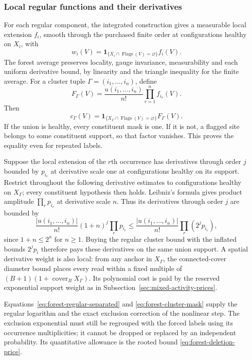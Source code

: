 \subsubsection{Local regular functions and their derivatives}
For each regular component, the integrated construction gives a
measurable local extension $f_i$, smooth through the purchased finite
order at configurations healthy on $X_i$, with
\[
w_i(V)=\mathbf1_{\{X_i\cap\operatorname{Flags}(V)=\varnothing\}}f_i(V).
\]
The forest average preserves locality, gauge invariance, measurability
and each uniform derivative bound, by linearity and the triangle
inequality for the finite average. For a cluster tuple
$\Gamma=(i_1,\ldots,i_n)$, define
\[
 F_\Gamma(V)=\frac{u(i_1,\ldots,i_n)}{n!}
                                      \prod_{r=1}^n f_{i_r}(V).
\]
Then
\begin{equation}\label{eq:forest-cluster-mask}
 c_\Gamma(V)=
 \mathbf1_{\{X_\Gamma\cap\operatorname{Flags}(V)=\varnothing\}}
                                                    F_\Gamma(V).
\end{equation}
If the union is healthy, every constituent mask is one. If it is
not, a flagged site belongs to some constituent support, so that
factor vanishes. This proves the equality even for repeated labels.

Suppose the local extension of the $r$th occurrence has derivatives
through order $j$ bounded by $p_{i_r}$ at derivative scale one at
configurations healthy on its support. Restrict throughout the
following derivative estimates to configurations healthy on
$X_\Gamma$; every constituent hypothesis then holds.
Leibniz's formula gives product amplitude $\prod_rp_{i_r}$ at
derivative scale $n$. Thus its derivatives through order $j$ are
bounded by
\[
        \frac{|u(i_1,\ldots,i_n)|}{n!}
                    (1+n)^j\prod_rp_{i_r}
       \le\frac{|u(i_1,\ldots,i_n)|}{n!}
                                      \prod_r(2^jp_{i_r}),
\]
since $1+n\le2^n$ for $n\ge1$. Buying the regular cluster bound
with the inflated bounds $2^jp_i$ therefore pays these derivatives
on the same union support. A spatial derivative weight is also local:
from any anchor in $X_\Gamma$, the connected-cover diameter bound
places every read within a fixed multiple of
$(B+1)(1+\operatorname{cover}_B X_\Gamma)$. Its polynomial cost is
paid by the reserved exponential support weight as in
Subsection~\ref{sec:mixed-activity-prices}.

Equations~\eqref{eq:forest-regular-separated} and
\eqref{eq:forest-cluster-mask} supply the regular logarithm and the
exact exclusion correction of the nonlinear step. The exclusion
exponential must still be regrouped with the forced labels using
its occurrence multiplicities; it cannot be dropped or replaced by
an independent probability. Its quantitative allowance is the
rooted bound \eqref{eq:forest-deletion-price}.
